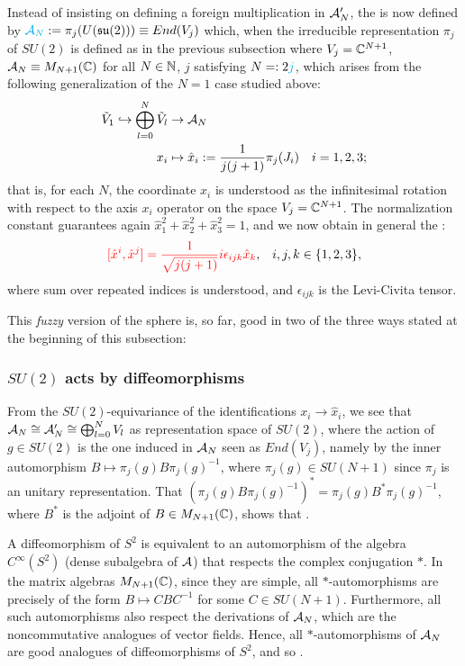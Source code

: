 Instead of insisting on defining a foreign multiplication in $\mathcal A'_N$, the  is now defined by $\textcolor{cyan}{\mathcal A_N} :=  \pi_{j}(U(\mathfrak{su}(2))) \equiv End(V_j)$ which, when the irreducible representation $\pi_j$ of $SU(2)$ is defined as in the previous subsection where $V_j = \mathbb{C}^{N+1}$, $\mathcal A_N \equiv M_{N+1}(\mathbb{C})$ for all $N \in \mathbb{N}$, $j$ satisfying $N =: 2\textcolor{cyan}{j}$, which arises from the following generalization of the $N = 1$ case studied above:
\begin{align}
    \tilde V_1 \hookrightarrow \bigoplus_{l = 0}^N \tilde V_l &\to \mathcal A_N\\
    x_i &\mapsto \hat x_i := \frac{1}{j(j+1)} \pi_{j}(J_i) & i = 1, 2, 3;
\end{align} that is, for each $N$, the coordinate $x_i$ is understood as the infinitesimal rotation with respect to the axis $x_i$ operator on the space $V_j = \mathbb{C}^{N+1}$. The normalization constant guarantees again $\hat x_1^2 + \hat x_2^2 + \hat x_3^2 = 1$, and we now obtain in general the :
\begin{align}
    \rtext{[\hat x^i, \hat x^j] = \frac{1}{\sqrt{j(j+1)}} i \epsilon_{ijk} \hat x_k}, && i, j, k \in \{1, 2, 3\},
\end{align} where sum over repeated indices is understood, and $\epsilon_{ijk}$ is the Levi-Civita tensor.

\lin

This \textit{fuzzy} version of the sphere is, so far, good in two of the three ways stated at the beginning of this subsection:

\subsubsection{$SU(2)$ acts by diffeomorphisms}

From the $SU(2)$-equivariance of the identifications $x_i \to \hat x_i$, we see that $\mathcal A_N \cong \mathcal A'_N \cong \bigoplus_{l=0}^N V_l$ as representation space of $SU(2)$, where the action of $g \in SU(2)$ is the one induced in $\mathcal A_N$ seen as $End(V_j)$, namely by the inner automorphism $B  \mapsto \pi_j(g)B \pi_j(g)^{-1}$, where $\pi_j(g) \in SU(N+1)$ since $\pi_j$ is an unitary representation. That $(\pi_j(g)B \pi_j(g)^{-1})^* = \pi_j(g)B^* \pi_j(g)^{-1}$, where $B^*$ is the adjoint of $B \in M_{N+1}(\mathbb{C})$, shows that .

A diffeomorphism of $S^2$ is equivalent to an automorphism of the algebra $C^\infty(S^2)$ (dense subalgebra of $\mathcal A$) that respects the complex conjugation $*$. In the matrix algebras $M_{N+1}(\mathbb{C})$, since they are simple, all $*$-automorphisms are precisely of the form $B \mapsto C B C^{-1}$ for some $C \in SU(N+1)$. Furthermore, all such automorphisms also respect the derivations of $\mathcal A_N$, which are the noncommutative analogues of vector fields. Hence, all $*$-automorphisms of $\mathcal A_N$ are good analogues of diffeomorphisms of $S^2$, and so .

